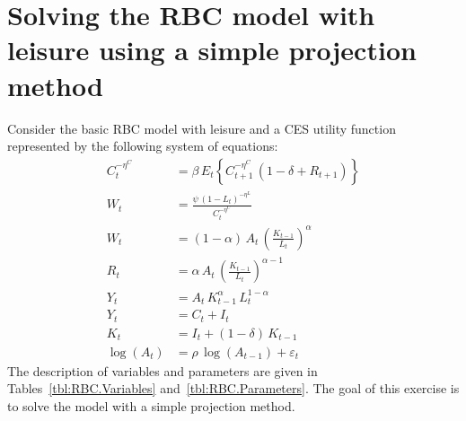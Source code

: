 \documentclass{article}
\begin{document}
\newpage

\section[Solving the RBC model with leisure using a simple projection method]{Solving the RBC model with leisure using a simple projection method\label{ex:RBCLeisureProjection}}
Consider the basic RBC model with leisure and a CES utility function represented by the following system of equations:
\begin{align*}
{{C}}_{t}^{-{{\eta^C}}} &={{\beta}}\, E_t \left \{{{C}}_{t+1}^{-{{\eta^C}}}\, \left(1-{{\delta}}+{{R}}_{t+1}\right) \right \}
\\
{{W}}_{t}&=\frac{\psi \, {\left(1-{{L}}_{t}\right)}^{-{{\eta^L}}}}{{{C}}_{t}^{-{{\eta^C}}}}
\\
{{W}}_{t}&=\left(1-{{\alpha}}\right)\, {{A}}_{t}\, {\left(\frac{{{K}}_{t-1}}{{{L}}_{t}}\right)}^{{{\alpha}}}
\\
{{R}}_{t}&={{\alpha}}\, {{A}}_{t}\, {\left(\frac{{{K}}_{t-1}}{{{L}}_{t}}\right)}^{{{\alpha}}-1}
\\
{{Y}}_{t}&={{A}}_{t}\, {{K}}_{t-1}^{{{\alpha}}}\, {{L}}_{t}^{1-{{\alpha}}}
\\
{{Y}}_{t}&={{C}}_{t}+{{I}}_{t}
\\
{{K}}_{t}&={{I}}_{t}+\left(1-{{\delta}}\right)\, {{K}}_{t-1}
\\
\log\left({{A}}_{t}\right)&={{\rho}}\, \log\left({{A}}_{t-1}\right)+{{\varepsilon}}_{t}
\end{align*}
The description of variables and parameters are given in Tables~\ref{tbl:RBC.Variables} and~\ref{tbl:RBC.Parameters}.
The goal of this exercise is to solve the model with a simple projection method.
\end{document}
